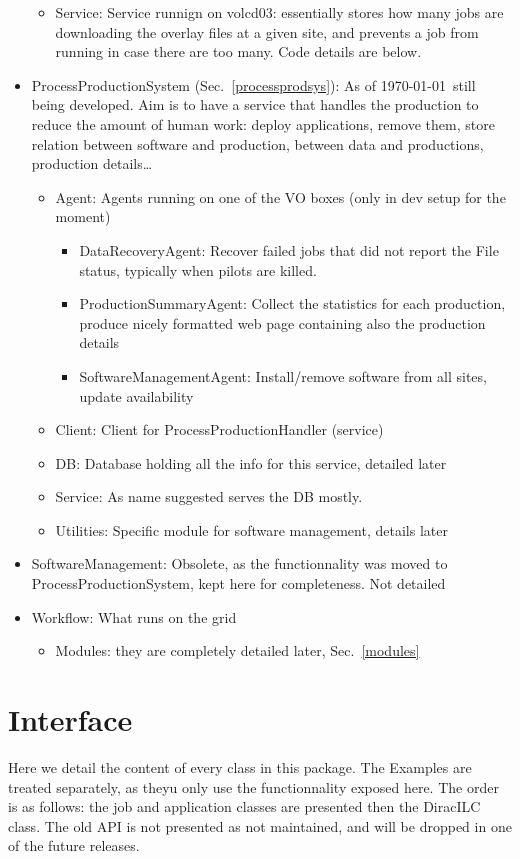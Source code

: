 \documentclass[a4paper,12pt]{article}
\begin{document}
\begin{itemize}
\begin{itemize}
    \item Service: Service runnign on volcd03: essentially stores how many jobs
    are downloading the overlay files at a given site, and prevents a job from
    running in case there are too many. Code details are below.
  \end{itemize}
  \item ProcessProductionSystem (Sec.~\ref{processprodsys}): As of \today\
  still being developed. Aim is to have a service that handles the production to reduce the amount of human work:
  deploy applications, remove them, store relation between software and
  production, between data and productions, production details\ldots
  \begin{itemize}
    \item Agent: Agents running on one of the VO boxes (only in dev setup for
    the moment)
    \begin{itemize}
      \item DataRecoveryAgent: Recover failed jobs that did not report the File
      status, typically when pilots are killed.
      \item ProductionSummaryAgent: Collect the statistics for each production,
      produce nicely formatted web page containing also the production details
      \item SoftwareManagementAgent: Install/remove software from all sites,
      update availability
    \end{itemize}
    \item Client: Client for ProcessProductionHandler (service)
    \item DB: Database holding all the info for this service, detailed later
    \item Service: As name suggested serves the DB mostly.
    \item Utilities: Specific module for software management, details later
  \end{itemize}
  \item SoftwareManagement: Obsolete, as the functionnality was moved to
  ProcessProductionSystem, kept here for completeness. Not detailed
  \item Workflow: What runs on the grid
  \begin{itemize}
    \item Modules: they are completely detailed later, Sec.~\ref{modules}
  \end{itemize}
\end{itemize}


\section{Interface}\label{interface}
Here we detail the content of every class in this package. The Examples are
treated separately, as theyu only use the functionnality exposed here. The order
is as follows: the job and application classes are presented then the DiracILC
class. The old API is not presented as not maintained, and will be dropped in one of the future
releases.
\end{document}
